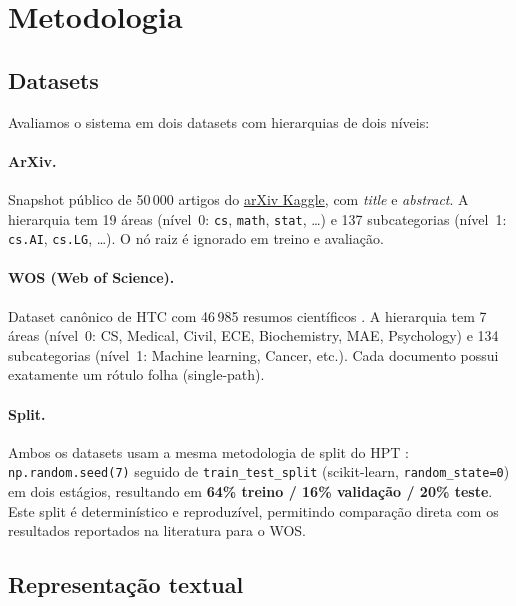 \documentclass[11pt,a4paper,twoside]{article}
\begin{document}
\section{Metodologia}
\label{sec:method}

\subsection{Datasets}

Avaliamos o sistema em dois datasets com hierarquias de dois níveis:

\paragraph{ArXiv.}
Snapshot público de 50\,000 artigos do
\href{https://www.kaggle.com/datasets/Cornell-University/arxiv}{arXiv Kaggle},
com \textit{title} e \textit{abstract}. A hierarquia tem 19 áreas (nível~0:
\texttt{cs}, \texttt{math}, \texttt{stat}, \dots) e 137 subcategorias (nível~1:
\texttt{cs.AI}, \texttt{cs.LG}, \dots). O nó raiz é ignorado em treino e avaliação.

\paragraph{WOS (Web of Science).}
Dataset canônico de HTC com 46\,985 resumos científicos \cite{zhou2020hiagm}.
A hierarquia tem 7 áreas (nível~0: CS, Medical, Civil, ECE, Biochemistry, MAE,
Psychology) e 134 subcategorias (nível~1: Machine learning, Cancer, etc.).
Cada documento possui exatamente um rótulo folha (single-path).

\paragraph{Split.}
Ambos os datasets usam a mesma metodologia de split do HPT
\cite{wang2022hpt}: \texttt{np.random.seed(7)} seguido de
\texttt{train\_test\_split} (scikit-learn, \texttt{random\_state=0}) em dois
estágios, resultando em \textbf{64\% treino / 16\% validação / 20\% teste}.
Este split é determinístico e reproduzível, permitindo comparação direta com
os resultados reportados na literatura para o WOS.

\subsection{Representação textual}
\end{document}
